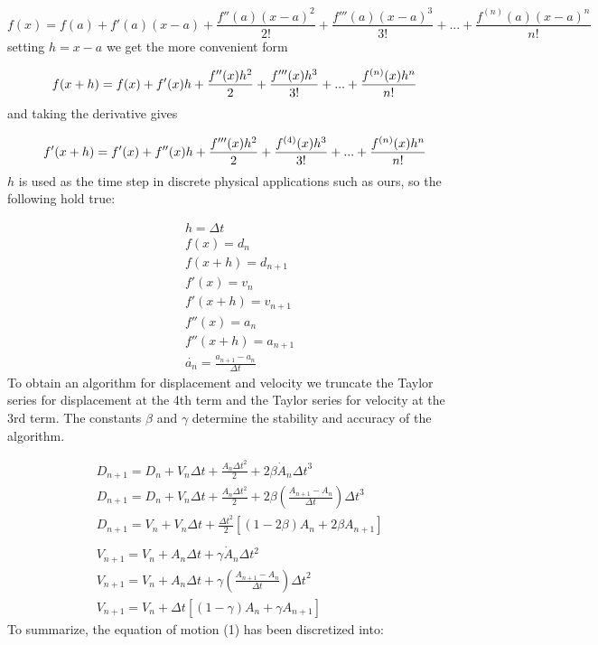 \documentclass{article}
\begin{document}
				\begin{equation}
					f(x) = f(a) + f'(a) \left( x-a \right)+{\frac { f''(a) \left( x-a \right) ^{2}}{2!}}+{\frac { f'''(a) \left( x-a \right) ^{3}}{3!}}+...+{\frac { f^{(n)}(a) \left( x-a \right) ^{n}}{n!}}
				\end{equation}
setting $h = x-a$ we get the more convenient form

				\begin{equation}
					f(x+h) = f(x) + f'(x)h +{\frac { f''(x) h ^{2}}{2}}+{\frac { f'''(x) h^{3}}{3!}}+...+{\frac { f^{(n)}(x)  h^{n}}{n!}}\\
				\end{equation}
and taking the derivative gives

				\begin{equation}
					f'(x+h) = f'(x) + f''(x)h +{\frac { f'''(x) h ^{2}}{2}}+{\frac { f^{(4)}(x) h^{3}}{3!}}+...+{\frac { f^{(n)}(x)  h^{n}}{n!}}\\
				\end{equation}
$h$ is used as the time step in discrete physical applications such as ours, so the following hold true:

				\begin{align*}
					&h=\Delta t\\
					&f \left( x \right) =d_{{n}}\\
					&f \left( x+h \right) =d_{{n+1}}\\
					&f'(x) =v_{{n}}\\
					&f'(x+h) =v_{{n+1}}\\
					&f''(x) =a_{{n}}\\
					&f''(x+h) =a_{{n+1}}\\
					&\dot{a_{{n}}}=\frac {a_{{n+1}}-a_{{n}}}{\Delta t}	
				\end{align*}
To obtain an algorithm for displacement and velocity we truncate the Taylor series for displacement at the 4th term and the Taylor series for velocity at the 3rd term. The constants $\beta$ and $\gamma$ determine the stability and accuracy of the algorithm.

				\begin{align*}
				&D_{n+1} = D_{n}+V_{n}\Delta t+\frac{A_{{n}}{\Delta t}^{2}}{2}+2\beta \dot{A}_{n}{\Delta t}^3\\
				&D_{n+1} = D_{n}+V_{n}\Delta t+\frac{A_{{n}}{\Delta t}^{2}}{2}+2\beta (\frac {A_{{n+1}}-A_{{n}}}{\Delta t}){\Delta t}^3\\
				&D_{n+1} = V_{n}+V_{n}\Delta t+\frac{{\Delta t}^{2}}{2}[(1-2\beta)A_n + 2\beta A_{n+1}]\\ \\
				&V_{n+1} = V_{n}+A_{n}\Delta t+\gamma \dot{A}_{n} \Delta t^2\\
				&V_{n+1} = V_{n}+A_{n}\Delta t+\gamma(\frac{A_{n+1} - A_n}{\Delta t}){\Delta t}^2\\
				&V_{n+1} = V_{n}+\Delta t[(1-\gamma)A_n + \gamma A_{n+1}]
				\end{align*}
To summarize, the equation of motion (1) has been discretized into:
\end{document}
